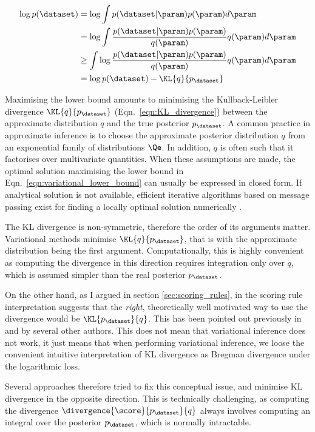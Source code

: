 \begin{align}
	\log p(\dataset) &= \log \int p(\dataset\vert\param)p(\param) d\param\\
		&=\log \int \frac{p(\dataset\vert\param)p(\param)}{q(\param)}q(\param) d\param\\
		&\geq \int \log \frac{p(\dataset\vert\param)p(\param)}{q(\param)} q(\param) d\param\\
		&= \log p(\dataset) - \KL{q}{p_{\dataset}}      \label{eqn:variational_lower_bound}
\end{align}

Maximising the lower bound amounts to minimising the Kullback-Leibler divergence $\KL{q}{p_{\dataset}}$ (Eqn.\ \eqref{eqn:KL_divergence}) between the approximate distribution $q$ and the true posterior $p_{\dataset}$. A common practice in approximate inference is to choose the approximate posterior distribution $q$ from an exponential family of distributions $\Qe$. In addition, $q$ is often such that it factorises over multivariate quantities. When these assumptions are made, the optimal solution maximising the lower bound in Eqn.\ \eqref{eqn:variational_lower_bound} can usually be expressed in closed form. If analytical solution is not available, efficient iterative algorithms based on message passing exist for finding a locally optimal solution numerically \citep{Winn2006}.

The KL divergence is non-symmetric, therefore the order of its arguments matter. Variational methods minimise $\KL{q}{p_{\dataset}}$, that is with the approximate distribution being the first argument. Computationally, this is highly convenient as computing the divergence in this direction requires integration only over $q$, which is assumed simpler than the real posterior $p_{\dataset}$. 

On the other hand, as I argued in section \ref{sec:scoring_rules}, in the scoring rule interpretation suggests that the \emph{right}, theoretically well motivated way to use the divergence would be $\KL{p_{\dataset}}{q}$. This has been pointed out previously in \citep{Csato2002,Minka2001} and by several other authors. This does not mean that variational inference does not work, it just means that when performing variational inference, we loose the convenient intuitive interpretation of KL divergence as Bregman divergence under the logarithmic loss.

Several approaches therefore tried to fix this conceptual issue, and minimise KL divergence in the opposite direction. This is technically challenging, as computing the divergence $\divergence{\score}{p_{\dataset}}{q}$ always involves computing an integral over the posterior $p_{\dataset}$, which is normally intractable.

